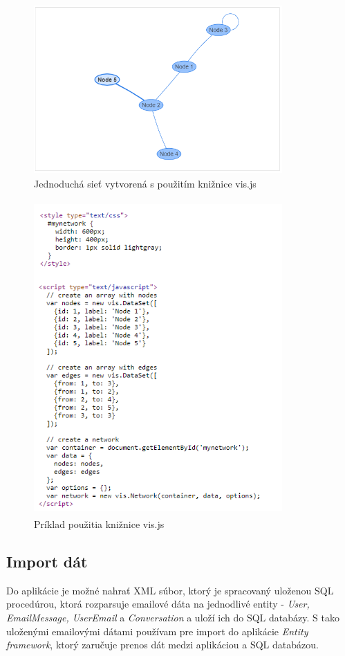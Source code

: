 \documentclass[slovak,master,public,dept460,male,cpdeclaration,oneside]{diploma}
\begin{document}
\begin{figure}[H]
\centering
\includegraphics[width=9.5cm, height=6.5cm]{figures/vis_basic_usage}
\caption{Jednoduchá sieť vytvorená s použitím knižnice vis.js}
\end{figure}


\begin{figure}[H]
\centering
\includegraphics[width=9.5cm, height=12cm]{figures/vis_basiccode}
\caption{Príklad použitia knižnice vis.js}
\end{figure}


\subsection{Import dát}
Do aplikácie je možné nahrať XML súbor, ktorý je spracovaný uloženou SQL procedúrou, ktorá rozparsuje emailové dáta na jednodlivé entity - \textit{User, EmailMessage, UserEmail} a \textit{Conversation} a uloží ich do SQL databázy. S tako uloženými emailovými dátami používam pre import do aplikácie \textit{Entity framework}, ktorý zaručuje prenos dát medzi aplikáciou a SQL databázou.
\end{document}
